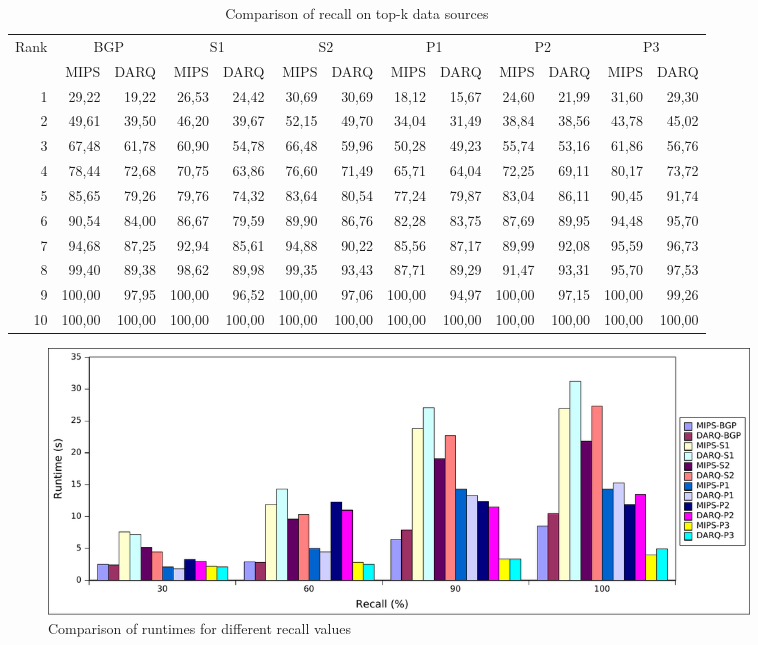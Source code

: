 \documentclass{sig-alternate}  %
\begin{document}
\begin{table}
\centering
\begin{tabular}{rrrrrrrrrrrrr}
\hline
Rank		 & \multicolumn{2}{c}{BGP}	& \multicolumn{2}{c}{S1}	&\multicolumn{2}{c}{S2}	&\multicolumn{2}{c}{P1}	& \multicolumn{2}{c}{P2}	& \multicolumn{2}{c}{P3} \\
	& MIPS & DARQ & MIPS & DARQ & MIPS & DARQ & MIPS & DARQ & MIPS & DARQ & MIPS & DARQ \\\hline
1 & 29,22 & 19,22 & 26,53 & 24,42 & 30,69 & 30,69 & 18,12 & 15,67 & 24,60 & 21,99 & 31,60 & 29,30 \\
2 & 49,61 & 39,50 & 46,20 & 39,67 & 52,15 & 49,70 & 34,04 & 31,49 & 38,84 & 38,56 & 43,78 & 45,02 \\
3 & 67,48 & 61,78 & 60,90 & 54,78 & 66,48 & 59,96 & 50,28 & 49,23 & 55,74 & 53,16 & 61,86 & 56,76 \\
4 & 78,44 & 72,68 & 70,75 & 63,86 & 76,60 & 71,49 & 65,71 & 64,04 & 72,25 & 69,11 & 80,17 & 73,72\\
5 & 85,65 & 79,26 & 79,76 & 74,32 & 83,64 & 80,54 & 77,24 & 79,87 & 83,04 & 86,11 & 90,45 & 91,74\\
6 & 90,54 & 84,00 & 86,67 & 79,59 & 89,90 & 86,76 & 82,28 & 83,75 & 87,69 & 89,95 & 94,48 & 95,70\\
7 & 94,68 & 87,25 & 92,94 & 85,61 & 94,88 & 90,22 & 85,56 & 87,17 & 89,99 & 92,08 & 95,59 & 96,73\\
8 & 99,40 & 89,38 & 98,62 & 89,98 & 99,35 & 93,43 & 87,71 & 89,29 & 91,47 & 93,31 & 95,70 & 97,53\\
9 & 100,00& 97,95 & 100,00& 96,52 & 100,00& 97,06 & 100,00& 94,97 & 100,00& 97,15 & 100,00& 99,26\\
10& 100,00& 100,00& 100,00& 100,00& 100,00& 100,00& 100,00& 100,00& 100,00& 100,00& 100,00& 100,00\\\hline
\end{tabular}
\caption{Comparison of recall on top-k data sources}
\label{tab:recall}
\end{table}


\begin{figure}
\begin{centering}
\includegraphics[width = 0.9\textwidth]{img/runtime_recall} 
\par\end{centering}
\caption{Comparison of runtimes for different recall values}
\label{fig:runtime_recall}
\end{figure}
\end{document}
